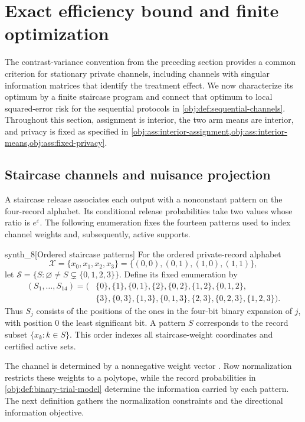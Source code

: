 \documentclass[11pt]{article}
\begin{document}
\section{Exact efficiency bound and finite optimization}

The contrast-variance convention from the preceding section provides a common criterion for stationary private channels, including channels with singular information matrices that identify the treatment effect. We now characterize its optimum by a finite staircase program and connect that optimum to local squared-error risk for the sequential protocols in \cref{obj:def:sequential-channels}. Throughout this section, assignment is interior, the two arm means are interior, and privacy is fixed as specified in \cref{obj:ass:interior-assignment,obj:ass:interior-means,obj:ass:fixed-privacy}.

\subsection{Staircase channels and nuisance projection}

A staircase release associates each output with a nonconstant pattern on the four-record alphabet. Its conditional release probabilities take two values whose ratio is \(e^\varepsilon\). The following enumeration fixes the fourteen patterns  used to index channel weights and, subsequently, active supports.

\begin{definitionv}{synth_8}[Ordered staircase patterns]
For the ordered private-record alphabet
\[
\mathcal X=\{x_0,x_1,x_2,x_3\}
=\{(0,0),(0,1),(1,0),(1,1)\},
\]
let \(\mathcal S=\{S:\varnothing\ne S\subsetneq\{0,1,2,3\}\}\).
Define its fixed enumeration by
\[
\begin{aligned}
(S_1,\ldots,S_{14})=\bigl(
&\{0\},\{1\},\{0,1\},\{2\},\{0,2\},\{1,2\},\{0,1,2\},\\
&\{3\},\{0,3\},\{1,3\},\{0,1,3\},\{2,3\},\{0,2,3\},\{1,2,3\}
\bigr).
\end{aligned}
\]
Thus \(S_j\) consists of the positions of the ones in the four-bit binary expansion of \(j\), with position \(0\) the least significant bit. A pattern \(S\) corresponds to the record subset \(\{x_k:k\in S\}\). This order indexes all staircase-weight coordinates and certified active sets.
\end{definitionv}

The channel is determined by a nonnegative weight vector . Row normalization restricts these weights to a polytope, while the record probabilities in \cref{obj:def:binary-trial-model} determine the information carried by each pattern. The next definition gathers the normalization constraints and the directional information objective.
\end{document}
